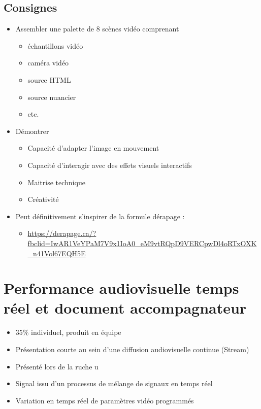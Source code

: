 \documentclass[
  french,
]{book}
\providecommand{\tightlist}{%
  \setlength{\itemsep}{0pt}\setlength{\parskip}{0pt}}
\begin{document}
\hypertarget{consignes-3}{%
\subsection{Consignes}\label{consignes-3}}

\begin{itemize}
\tightlist
\item
  Assembler une palette de 8 scènes vidéo comprenant

  \begin{itemize}
  \tightlist
  \item
    échantillons vidéo
  \item
    caméra vidéo
  \item
    source HTML
  \item
    source nuancier
  \item
    etc.
  \end{itemize}
\item
  Démontrer

  \begin{itemize}
  \tightlist
  \item
    Capacité d'adapter l'image en mouvement
  \item
    Capacité d'interagir avec des effets visuels interactifs
  \item
    Maitrise technique
  \item
    Créativité
  \end{itemize}
\item
  Peut définitivement s'inspirer de la formule dérapage :

  \begin{itemize}
  \tightlist
  \item
    \url{https://derapage.ca/?fbclid=IwAR1VeYPaM7V9x1IoA0_eM9vtRQpD9VERCpwDl4oRTxOXK_n41Vol67EQH5E}
  \end{itemize}
\end{itemize}

\hypertarget{sommatif_5}{%
\section{Performance audiovisuelle temps réel et document accompagnateur}\label{sommatif_5}}

\begin{itemize}
\tightlist
\item
  35\% individuel, produit en équipe
\item
  Présentation courte au sein d'une diffusion audiovisuelle continue (Stream)
\item
  Présenté lors de la ruche u
\item
  Signal issu d'un processus de mélange de signaux en temps réel
\item
  Variation en temps réel de paramètres vidéo programmés
\end{itemize}
\end{document}
